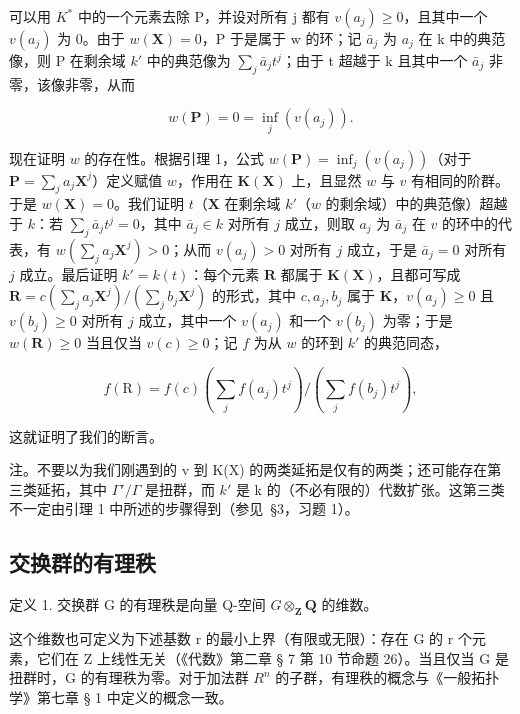 可以用 \(K^{*}\) 中的一个元素去除 P，并设对所有 j 都有 \(v(a_{j}) \geqslant 0\)，且其中一个 \(v(a_{j})\) 为 0。由于 \(w(\mathbf{X}) = 0\)，P 于是属于 w 的环；记 \(\bar{a}_{j}\) 为 \(a_{j}\) 在 k 中的典范像，则 P 在剩余域 \(k'\) 中的典范像为 \(\sum_{j} \bar{a}_{j} t^{j}\)；由于 t 超越于 k 且其中一个 \(\bar{a}_{j}\) 非零，该像非零，从而

\[
w (\mathbf {P}) = 0 = \inf _ {j} (v (a _ {j})).
\]

现在证明 \(w\) 的存在性。根据引理 1，公式 \(w(\mathbf{P}) = \inf_{j}(v(a_j))\)（对于 \(\mathbf{P} = \sum_{j} a_j \mathbf{X}^j\)）定义赋值 \(w\)，作用在 \(\mathbf{K}(\mathbf{X})\) 上，且显然 \(w\) 与 \(v\) 有相同的阶群。于是 \(w(\mathbf{X}) = 0\)。我们证明 \(t\)（\(\mathbf{X}\) 在剩余域 \(k'\)（\(w\) 的剩余域）中的典范像）超越于 \(k\)：若 \(\sum_{j} \bar{a}_j t^j = 0\)，其中 \(\bar{a}_j \in k\) 对所有 \(j\) 成立，则取 \(a_j\) 为 \(\bar{a}_j\) 在 \(v\) 的环中的代表，有 \(w\left(\sum_{j} a_j \mathbf{X}^j\right) > 0\)；从而 \(v(a_j) > 0\) 对所有 \(j\) 成立，于是 \(\bar{a}_j = 0\) 对所有 \(j\) 成立。最后证明 \(k' = k(t)\)：每个元素 \(\mathbf{R}\) 都属于 \(\mathbf{K}(\mathbf{X})\)，且都可写成 \(\mathbf{R} = c\left(\sum_{j} a_j \mathbf{X}^j\right) / \left(\sum_{j} b_j \mathbf{X}^j\right)\) 的形式，其中 \(c, a_j, b_j\) 属于 \(\mathbf{K}\)，\(v(a_j) \geqslant 0\) 且 \(v(b_j) \geqslant 0\) 对所有 \(j\) 成立，其中一个 \(v(a_j)\) 和一个 \(v(b_j)\) 为零；于是 \(w(\mathbf{R}) \geqslant 0\) 当且仅当 \(v(c) \geqslant 0\)；记 \(f\) 为从 \(w\) 的环到 \(k'\) 的典范同态，

\[
f (\mathrm{R}) = f (c) \left(\sum_ {j} f (a _ {j}) t ^ {j}\right) / \left(\sum_ {j} f (b _ {j}) t ^ {j}\right),
\]

这就证明了我们的断言。

注。不要以为我们刚遇到的 v 到 K(X) 的两类延拓是仅有的两类；还可能存在第三类延拓，其中 \(\Gamma'/\Gamma\) 是扭群，而 \(k'\) 是 k 的（不必有限的）代数扩张。这第三类不一定由引理 1 中所述的步骤得到（参见~§3，习题 1）。

\subsection{交换群的有理秩}

定义 1. 交换群 G 的有理秩是向量 Q-空间 \(G \otimes_{\mathbf{Z}} \mathbf{Q}\) 的维数。

这个维数也可定义为下述基数 r 的最小上界（有限或无限）：存在 G 的 r 个元素，它们在 Z 上线性无关（《代数》第二章 § 7 第 10 节命题 26）。当且仅当 G 是扭群时，G 的有理秩为零。对于加法群 \(R^{n}\) 的子群，有理秩的概念与《一般拓扑学》第七章 § 1 中定义的概念一致。

